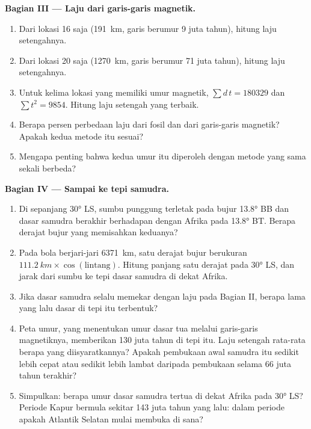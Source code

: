 \begin{problem}
\medskip
\noindent\textbf{Bagian III --- Laju dari garis-garis magnetik.}
\begin{enumerate}[resume]
  \item Dari lokasi 16 saja (\qty{191}{km}, garis berumur 9 juta tahun),
        hitung laju setengahnya.
  \item Dari lokasi 20 saja (\qty{1270}{km}, garis berumur 71 juta tahun),
        hitung laju setengahnya.
  \item Untuk kelima lokasi yang memiliki umur magnetik,
        $\sum d\,t = \num{180329}$ dan
        $\sum t^2 = \num{9854}$. Hitung laju setengah yang terbaik.
  \item Berapa persen perbedaan laju dari fosil dan dari garis-garis magnetik?
        Apakah kedua metode itu sesuai?
  \item Mengapa penting bahwa kedua umur itu diperoleh dengan metode yang sama
        sekali berbeda?
\end{enumerate}

\medskip
\noindent\textbf{Bagian IV --- Sampai ke tepi samudra.}
\begin{enumerate}[resume]
  \item Di sepanjang \ang{30} LS, sumbu punggung terletak pada bujur
        \ang{13.8} BB dan dasar samudra berakhir berhadapan dengan Afrika pada
        \ang{13.8} BT. Berapa derajat bujur yang memisahkan keduanya?
  \item Pada bola berjari-jari \qty{6371}{km}, satu derajat bujur
        berukuran $\qty{111.2}{km} \times \cos(\text{lintang})$. Hitung
        panjang satu derajat pada \ang{30} LS, dan jarak dari sumbu ke tepi
        dasar samudra di dekat Afrika.
  \item Jika dasar samudra selalu memekar dengan laju pada Bagian II, berapa
        lama yang lalu dasar di tepi itu terbentuk?
  \item Peta umur, yang menentukan umur dasar tua melalui garis-garis
        magnetiknya, memberikan \num{130} juta tahun di tepi itu. Laju setengah
        rata-rata berapa yang diisyaratkannya? Apakah pembukaan awal samudra
        itu sedikit lebih cepat atau sedikit lebih lambat daripada pembukaan
        selama 66 juta tahun terakhir?
  \item Simpulkan: berapa umur dasar samudra tertua di dekat Afrika pada
        \ang{30} LS? Periode Kapur bermula sekitar \num{143} juta tahun yang
        lalu: dalam periode apakah Atlantik Selatan mulai membuka di sana?
\end{enumerate}
\end{problem}
